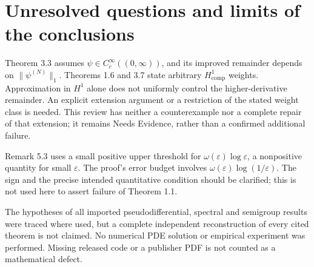 \documentclass[10pt]{article}
\begin{document}
\section*{Unresolved questions and limits of the conclusions}
Theorem 3.3 assumes \(\psi\in C^\infty_c((0,\infty))\), and its improved remainder depends on \(\|\psi^{(N)}\|_1\). Theorems 1.6 and 3.7 state arbitrary \(H^1_{\mathrm{comp}}\) weights. Approximation in \(H^1\) alone does not uniformly control the higher-derivative remainder. An explicit extension argument or a restriction of the stated weight class is needed. This review has neither a counterexample nor a complete repair of that extension; it remains Needs Evidence, rather than a confirmed additional failure.\par
Remark 5.3 uses a small positive upper threshold for \(\omega(\varepsilon)\log\varepsilon\), a nonpositive quantity for small \(\varepsilon\). The proof’s error budget involves \(\omega(\varepsilon)\log(1/\varepsilon)\). The sign and the precise intended quantitative condition should be clarified; this is not used here to assert failure of Theorem 1.1.\par
The hypotheses of all imported pseudodifferential, spectral and semigroup results were traced where used, but a complete independent reconstruction of every cited theorem is not claimed. No numerical PDE solution or empirical experiment was performed. Missing released code or a publisher PDF is not counted as a mathematical defect.\par
\end{document}

